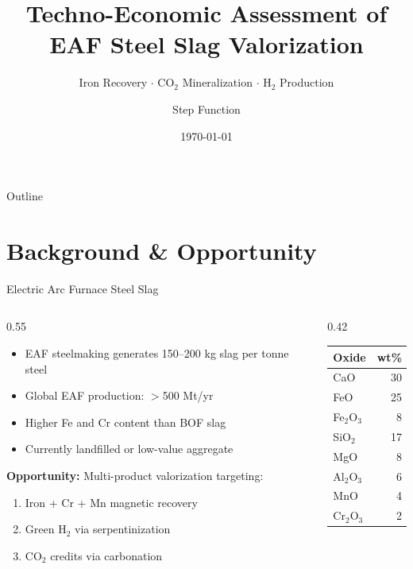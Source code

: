 \documentclass[aspectratio=169]{beamer}
\title{Techno-Economic Assessment of\\[4pt] \textbf{EAF Steel Slag} Valorization}
\subtitle{Iron Recovery $\cdot$ CO$_2$ Mineralization $\cdot$ H$_2$ Production}
\author{Step Function}
\date{\today}
\begin{document}
\begin{frame}
\titlepage
\end{frame}

\begin{frame}{Outline}
\tableofcontents
\end{frame}

\section{Background \& Opportunity}

\begin{frame}{Electric Arc Furnace Steel Slag}
\begin{columns}[T]
\begin{column}{0.55\textwidth}
\begin{itemize}
  \item EAF steelmaking generates 150--200 kg slag per tonne steel
  \item Global EAF production: $>$500 Mt/yr
  \item Higher Fe and Cr content than BOF slag
  \item Currently landfilled or low-value aggregate
\end{itemize}
\vspace{8pt}
\textbf{Opportunity:} Multi-product valorization targeting:
\begin{enumerate}
  \item Iron + Cr + Mn magnetic recovery
  \item Green H$_2$ via serpentinization
  \item CO$_2$ credits via carbonation
\end{enumerate}
\end{column}
\begin{column}{0.42\textwidth}
\begin{tabular}{@{}lr@{}}
\toprule
\textbf{Oxide} & \textbf{wt\%} \\
\midrule
CaO     & 30 \\
FeO     & 25 \\
Fe$_2$O$_3$ & 8 \\
SiO$_2$ & 17 \\
MgO     & 8 \\
Al$_2$O$_3$ & 6 \\
MnO     & 4 \\
Cr$_2$O$_3$ & 2 \\
\bottomrule
\end{tabular}
\end{column}
\end{columns}
\end{frame}
\end{document}
